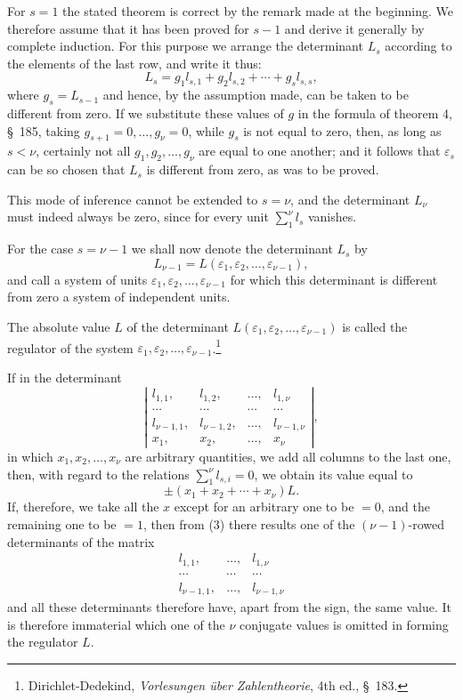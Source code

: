 \documentclass[11pt]{article}
\begin{document}
For $s=1$ the stated theorem is correct by the remark made at the beginning. We therefore assume that it
has been proved for $s-1$ and derive it generally by complete induction. For this purpose we arrange the determinant $L_s$ according to the elements of the last row, and write it thus:
\begin{equation}
L_s=g_1l_{s,1}+g_2l_{s,2}+\cdots+g_sl_{s,s},
\tag{2}
\end{equation}
where $g_s=L_{s-1}$ and hence, by the assumption made, can be taken to be different from zero. If we substitute these values of $g$ in the formula of theorem 4, \S~185, taking $g_{s+1}=0,\ldots,g_\nu=0$, while $g_s$ is not equal to zero, then, as long as $s<\nu$, certainly not all $g_1,g_2,\ldots,g_\nu$ are equal to one another; and it follows that $\varepsilon_s$ can be so chosen that $L_s$ is different from zero, as was to be proved.

This mode of inference cannot be extended to $s=\nu$, and the determinant $L_\nu$ must indeed always be zero, since for every unit $\sum_{1}^{\nu} l_s$ vanishes.

For the case $s=\nu-1$ we shall now denote the determinant $L_s$ by
\begin{equation}
L_{\nu-1}=L(\varepsilon_1,\varepsilon_2,\ldots,\varepsilon_{\nu-1}),
\tag{3}
\end{equation}
and call a system of units $\varepsilon_1,\varepsilon_2,\ldots,\varepsilon_{\nu-1}$ for which this determinant is different from zero a system of independent units.

The absolute value $L$ of the determinant $L(\varepsilon_1,\varepsilon_2,\ldots,\varepsilon_{\nu-1})$ is called the regulator of the system $\varepsilon_1,\varepsilon_2,\ldots,\varepsilon_{\nu-1}$.\footnote{Dirichlet-Dedekind, \textit{Vorlesungen über Zahlentheorie}, 4th ed., \S~183.}

If in the determinant
\begin{equation}
\left|\begin{array}{cccc}
l_{1,1},&l_{1,2},&\ldots,&l_{1,\nu}\\
\cdots&\cdots&\cdots&\cdots\\
l_{\nu-1,1},&l_{\nu-1,2},&\ldots,&l_{\nu-1,\nu}\\
x_1,&x_2,&\ldots,&x_\nu
\end{array}\right|,
\tag{4}
\end{equation}
in which $x_1,x_2,\ldots,x_\nu$ are arbitrary quantities, we add all columns to the last one, then, with regard to the relations $\sum_{1}^{\nu}l_{s,i}=0$, we obtain its value equal to
\[
\pm(x_1+x_2+\cdots+x_\nu)L.
\]
If, therefore, we take all the $x$ except for an arbitrary one
to be $=0$, and the remaining one to be $=1$, then from (3) there results one of the $(\nu-1)$-rowed determinants of the matrix
\[
\begin{array}{ccc}
l_{1,1},&\ldots,&l_{1,\nu}\\
\cdots&\cdots&\cdots\\
l_{\nu-1,1},&\ldots,&l_{\nu-1,\nu}
\end{array}
\]
and all these determinants therefore have, apart from the sign, the same value. It is therefore immaterial which one of the $\nu$ conjugate values is omitted in forming the regulator $L$.
\end{document}
